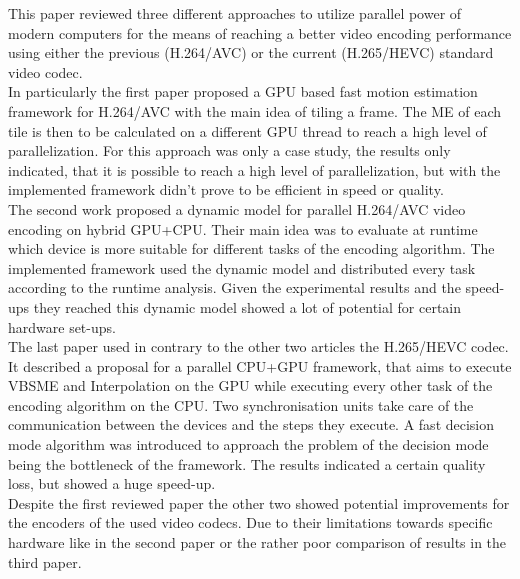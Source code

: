 This paper reviewed three different approaches to utilize parallel power of modern computers for the means of reaching a better video encoding performance 
using either the previous (H.264/AVC) or the current (H.265/HEVC) standard video codec. \\

In particularly the first paper \cite{Paper1} proposed a GPU based fast motion estimation framework for H.264/AVC with the main idea of tiling a frame. 
The ME of each tile is then to be calculated on a different GPU thread to reach a high level of parallelization. 
For this approach was only a case study, the results only indicated, that it is possible to reach a high level of parallelization, 
but with the implemented framework didn't prove to be efficient in speed or quality.\\

The second work \cite{Paper2} proposed a dynamic model for parallel H.264/AVC video encoding on hybrid GPU+CPU. 
Their main idea was to evaluate at runtime which device is more suitable for different tasks of the encoding algorithm. 
The implemented framework used the dynamic model and distributed every task according to the runtime analysis. 
Given the experimental results and the speed-ups they reached this dynamic model showed a lot of potential for certain hardware set-ups.\\

The last paper \cite{Paper3} used in contrary to the other two articles the H.265/HEVC codec. 
It described a proposal for a parallel CPU+GPU framework, that aims to execute VBSME and Interpolation on the GPU 
while executing every other task of the encoding algorithm on the CPU. 
Two synchronisation units take care of the communication between the devices and the steps they execute. 
A fast decision mode algorithm was introduced to approach the problem of the decision mode being the bottleneck of the framework. 
The results indicated a certain quality loss, but showed a huge speed-up.\\

Despite the first reviewed paper the other two showed potential improvements for the encoders of the used video codecs. 
Due to their limitations towards specific hardware like in the second paper or the rather poor comparison of results in the third paper. \\

